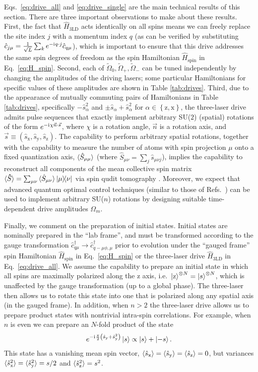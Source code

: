 \documentclass[aps,pra,nofootinbib,twocolumn,superscriptaddress]{revtex4-2}
\renewcommand{\t}{\text} %
\newcommand{\p}[1]{\left(#1\right)} %
\renewcommand{\set}[1]{\left\{#1\right\}} %
\newcommand{\bk}{\braket} %
\renewcommand{\v}{\bm} %
\renewcommand{\i}{\mathrm{i}\mkern1mu} %
\newcommand{\1}{\mathds{1}}
\renewcommand{\c}{\hat c}
\newcommand{\s}{\hat s}
\renewcommand{\H}{\hat H}
\renewcommand{\S}{\hat S}
\newcommand{\x}{\text{x}}
\newcommand{\y}{\text{y}}
\newcommand{\z}{\text{z}}
\newcommand{\spin}{\text{spin}}
\begin{document}
Eqs.~\eqref{eq:drive_all} and \eqref{eq:drive_single} are the main technical results of this section.
There are three important observations to make about these results.
First, the fact that $\H_{\t{3LD}}$ acts identically on all spins means we can freely replace the site index $j$ with a momentum index $q$ (as can be verified by substituting $\c_{j\mu}=\frac1{\sqrt{L}}\sum_k e^{-\i q\cdot j} \c_{q\mu}$), which is important to ensure that this drive addresses the same spin degrees of freedom as the spin Hamiltonian $\H_\spin$ in Eq.~\eqref{eq:H_spin}.
Second, each of $\tilde\Omega_0,\tilde\Omega_+,\tilde\Omega_-$ can be tuned independently by changing the amplitudes of the driving lasers; some particular Hamiltonians for specific values of these amplitudes are shown in Table \ref{tab:drives}.
Third, due to the appearance of mutually commuting pairs of Hamiltonians in Table \ref{tab:drives}, specifically $-\s_\alpha^2$ and $\pm \s_\alpha+\s_\alpha^2$ for $\alpha\in\set{\z,\x}$, the three-laser drive admits pulse sequences that exactly implement arbitrary SU($2$) (spatial) rotations of the form $e^{-\i\chi\vec n\cdot\vec s}$, where $\chi$ is a rotation angle, $\vec n$ is a rotation axis, and $\vec s\equiv(\s_\x,\s_\y,\s_\z)$.
The capability to perform arbitrary spatial rotations, together with the capability to measure the number of atoms with spin projection $\mu$ onto a fixed quantization axis, $\bk{\S_{\mu\mu}}$ (where $\S_{\mu\nu}=\sum_j\s_{\mu\nu j}$), implies the capability to reconstruct all components of the mean collective spin matrix $\bk{\v\S}=\sum_{\mu\nu}\bk{\S_{\mu\nu}}\op{\mu}{\nu}$ via spin qudit tomography \cite{newton1968measurability, perlin2020qudit}.
Moreover, we expect that advanced quantum optimal control techniques (similar to those of Refs.~\cite{anderson2015accurate, lucarelli2018quantum}) can be used to implement arbitrary SU($n$) rotations by designing suitable time-dependent drive amplitudes $\Omega_m$.

Finally, we comment on the preparation of initial states.
Initial states are nominally prepared in the ``lab frame'', and must be transformed according to the gauge transformation $\c_{q\mu}^\dag\to \c_{q-\mu\phi,\mu}^\dag$ prior to evolution under the ``gauged frame'' spin Hamiltonian $\H_\spin$ in Eq.~\eqref{eq:H_spin} or the three-laser drive $\H_{\t{3LD}}$ in Eq.~\eqref{eq:drive_all}.
We assume the capability to prepare an initial state in which all spins are maximally polarized along the z axis, i.e.~$\ket{\z}^{\otimes N}=\ket{s}^{\otimes N}$, which is unaffected by the gauge transformation (up to a global phase).
The three-laser then allows us to rotate this state into one that is polarized along any spatial axis (in the gauged frame).
In addition, when $n>2$ the three-laser drive allows us to prepare product states with nontrivial intra-spin correlations.
For example, when $n$ is even we can prepare an $N$-fold product of the state
\begin{align}
  e^{-\i\frac{\pi}{2}\p{\s_\y + \s_\y^2}} \ket{s}
  \propto \ket{s} + \ket{-s}.
\end{align}
This state has a vanishing mean spin vector, $\bk{\s_\x}=\bk{\s_\y}=\bk{\s_\z}=0$, but variances $\bk{\s_\x^2}=\bk{\s_\y^2}=s/2$ and $\bk{\s_\z^2}=s^2$.
\end{document}
